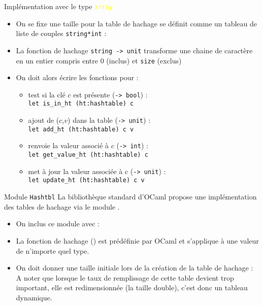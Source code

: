 \documentclass[10pt]{beamer}
\begin{document}
\begin{frame}{\Ctitle}{\stitle}
	\begin{block}{Implémentation avec le type \textcolor{yellow}{\tt array}}
		\begin{itemize}
			\item<1->On se fixe une taille pour la table de hachage se définit comme un tableau de liste de couples \texttt{string*int} :
			\item<2-> La fonction de hachage {\tt string -> unit} transforme une chaine de caractère en un entier compris entre 0 (inclus) et {\tt size} (exclus)
			\item<3-> On doit alors écrire les fonctions pour :
			\begin{itemize}
				\item<4->  test si la clé $c$ est présente ({\tt -> bool}) : \\
				\texttt{let is_in_ht (ht:hashtable) c}
				\item<5-> ajout de ($c$,$v$) dans la table ({\tt -> unit}) : \\
				\texttt{let add_ht (ht:hashtable) c v}
				\item<6-> renvoie la valeur associé à $c$ ({\tt -> int}) : \\
				\texttt{let get_value_ht (ht:hashtable) c}   
				\item<7-> met à jour la valeur associée  à c ({\tt -> unit}) : \\
				\texttt{let update_ht (ht:hashtable) c v} 	  
			\end{itemize}
		\end{itemize}
	\end{block}
\end{frame}

\begin{frame}{\Ctitle}{\stitle}
	\begin{block}{Module {\tt Hashtbl}}
		La bibliothèque standard d'OCaml propose une implémentation des tables de hachage via le module .
		\begin{itemize}
			\item<1-> On inclus ce module avec :
			\item<2-> La fonction de hachage () est prédéfinie par OCaml et s'applique à une valeur de n'importe quel type.
			\item<3-> On doit donner une taille initiale lors de la création de la table de hachage :
				A noter que lorsque le taux de remplissage de cette table devient trop important, elle est redimensionnée (la taille double), c'est donc un tableau dynamique.
		\end{itemize}
	\end{block}
\end{frame}
\end{document}
